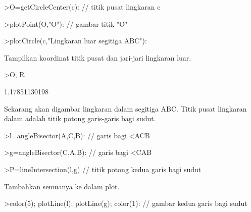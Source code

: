 \documentclass[12pt,Times new roman,letterpaper]{book}
\begin{document}
\begin{eulernootebook}
\begin{eulercomment}
\begin{eulercomment}
\begin{eulernootebook}
\begin{eulercomment}
\begin{eulercomment}
\begin{eulercomment}
\begin{eulercomment}
\begin{eulercomment}
\begin{eulercomment}
\begin{eulernotebook}
\begin{eulercomment}
\begin{eulerprompt}
>O=getCircleCenter(c): // titik pusat lingkaran c 
\end{eulerprompt}
\begin{eulerprompt}
>plotPoint(O,"O"): // gambar titik "O"
\end{eulerprompt}
\begin{eulerprompt}
>plotCircle(c,"Lingkaran luar segitiga ABC"):
\end{eulerprompt}
\begin{eulercomment}
Tampilkan koordinat titik pusat dan jari-jari lingkaran luar.
\end{eulercomment}
\begin{eulerprompt}
>O, R
\end{eulerprompt}
\begin{euleroutput}
  [1.16667,  1.16667]
  1.17851130198
\end{euleroutput}
\begin{eulercomment}
Sekarang akan digambar lingkaran dalam segitiga ABC. Titik pusat lingkaran dalam adalah
titik potong garis-garis bagi sudut.
\end{eulercomment}
\begin{eulerprompt}
>l=angleBisector(A,C,B): // garis bagi <ACB
\end{eulerprompt}
\begin{eulerprompt}
>g=angleBisector(C,A,B): // garis bagi <CAB
\end{eulerprompt}
\begin{eulerprompt}
>P=lineIntersection(l,g) // titik potong kedua garis bagi sudut
\end{eulerprompt}
\begin{euleroutput}
  [0.86038,  0.86038]
\end{euleroutput}
\begin{eulercomment}
Tambahkan semuanya ke dalam plot.
\end{eulercomment}
\begin{eulerprompt}
>color(5); plotLine(l); plotLine(g); color(1): // gambar kedua garis bagi sudut
\end{eulerprompt}

\end{eulercomment}
\end{eulernotebook}
\end{eulercomment}
\end{eulercomment}
\end{eulercomment}
\end{eulercomment}
\end{eulercomment}
\end{eulercomment}
\end{eulernootebook}
\end{eulercomment}
\end{eulercomment}
\end{eulernootebook}
\end{document}
